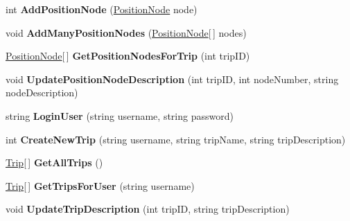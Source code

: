 \begin{DoxyCompactItemize}
\item 
\hypertarget{interface_i_trip_service_a1e18a8d9d2427b9794090e666bb549b2}{
int {\bfseries AddPositionNode} (\hyperlink{class_position_node}{PositionNode} node)}
\label{interface_i_trip_service_a1e18a8d9d2427b9794090e666bb549b2}

\item 
\hypertarget{interface_i_trip_service_a989bf5b377fd78dfd00917c9512eabec}{
void {\bfseries AddManyPositionNodes} (\hyperlink{class_position_node}{PositionNode}\mbox{[}$\,$\mbox{]} nodes)}
\label{interface_i_trip_service_a989bf5b377fd78dfd00917c9512eabec}

\item 
\hypertarget{interface_i_trip_service_aa28312fa4e26d384fefa7456ac8d7c59}{
\hyperlink{class_position_node}{PositionNode}\mbox{[}$\,$\mbox{]} {\bfseries GetPositionNodesForTrip} (int tripID)}
\label{interface_i_trip_service_aa28312fa4e26d384fefa7456ac8d7c59}

\item 
\hypertarget{interface_i_trip_service_a040f8ed636dd2f3e4a4fa059cfc9eada}{
void {\bfseries UpdatePositionNodeDescription} (int tripID, int nodeNumber, string nodeDescription)}
\label{interface_i_trip_service_a040f8ed636dd2f3e4a4fa059cfc9eada}

\item 
\hypertarget{interface_i_trip_service_ae7dad8ff13217bc8d97f43db7375c4c2}{
string {\bfseries LoginUser} (string username, string password)}
\label{interface_i_trip_service_ae7dad8ff13217bc8d97f43db7375c4c2}

\item 
\hypertarget{interface_i_trip_service_a6100ef3e23a8398c61e56ab12019bf29}{
int {\bfseries CreateNewTrip} (string username, string tripName, string tripDescription)}
\label{interface_i_trip_service_a6100ef3e23a8398c61e56ab12019bf29}

\item 
\hypertarget{interface_i_trip_service_ac6c4304690c75b8403afc111748cb6c4}{
\hyperlink{class_trip}{Trip}\mbox{[}$\,$\mbox{]} {\bfseries GetAllTrips} ()}
\label{interface_i_trip_service_ac6c4304690c75b8403afc111748cb6c4}

\item 
\hypertarget{interface_i_trip_service_a395882f03013b68ff9c855b6e78cb791}{
\hyperlink{class_trip}{Trip}\mbox{[}$\,$\mbox{]} {\bfseries GetTripsForUser} (string username)}
\label{interface_i_trip_service_a395882f03013b68ff9c855b6e78cb791}

\item 
\hypertarget{interface_i_trip_service_a06b0e6ffa6675f1d7767fa6ac3399eda}{
void {\bfseries UpdateTripDescription} (int tripID, string tripDescription)}
\label{interface_i_trip_service_a06b0e6ffa6675f1d7767fa6ac3399eda}


\end{DoxyCompactItemize}
